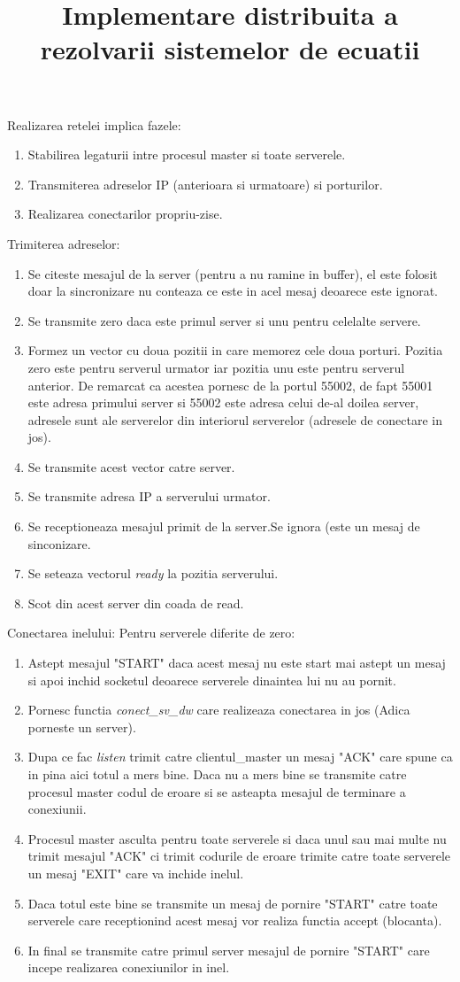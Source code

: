 \documentclass [12pt]{report}
\title{Implementare distribuita a rezolvarii sistemelor de ecuatii}
\date{}
\begin{document}
Realizarea retelei implica fazele:
\begin{enumerate}
\item Stabilirea legaturii intre procesul master si toate serverele.
\item Transmiterea adreselor IP (anterioara si urmatoare) si porturilor.
\item Realizarea conectarilor propriu-zise.
\end{enumerate}

Trimiterea adreselor:
\begin{enumerate}
\item Se citeste mesajul de la server (pentru a nu ramine in buffer), el 
este folosit doar la sincronizare nu conteaza ce este in acel mesaj 
deoarece este ignorat.
\item Se transmite zero daca este primul server si unu pentru celelalte
servere.
\item Formez un vector cu doua pozitii in care memorez cele doua porturi.
Pozitia zero este pentru serverul urmator iar pozitia unu este pentru
serverul anterior. De remarcat ca acestea pornesc de la portul 55002, de
fapt 55001 este adresa primului server si 55002 este adresa celui de-al
doilea server, adresele sunt ale serverelor din interiorul serverelor
(adresele de conectare in jos).
\item Se transmite acest vector catre server.
\item Se transmite adresa IP a serverului urmator.
\item Se receptioneaza mesajul primit de la server.Se ignora (este un mesaj
de sinconizare.
\item Se seteaza vectorul {\it ready} la pozitia serverului.
\item Scot din acest server din coada de read.
\end{enumerate}

Conectarea inelului:
Pentru serverele diferite de zero:
\begin{enumerate}
\item Astept mesajul "START" daca acest mesaj nu este start mai astept un
mesaj si apoi inchid socketul deoarece serverele dinaintea lui nu au pornit.
\item Pornesc functia {\it conect\_sv\_dw} care realizeaza conectarea in jos
(Adica porneste un server). 
\item Dupa ce fac {\it listen} trimit catre clientul\_master un mesaj "ACK"
care spune ca in pina aici totul a mers bine. Daca nu a mers bine se
transmite catre procesul master codul de eroare si se asteapta mesajul de
terminare a conexiunii.
\item Procesul master asculta pentru toate serverele si daca unul sau mai
multe nu trimit mesajul "ACK" ci trimit codurile de eroare trimite catre
toate serverele un mesaj "EXIT" care va inchide inelul.
\item Daca totul este bine se transmite un mesaj de pornire "START" catre
toate serverele care receptionind acest mesaj vor realiza functia accept
(blocanta).
\item In final se transmite catre primul server mesajul de pornire "START"
care incepe realizarea conexiunilor in inel.
\end{enumerate}
\end{document}
